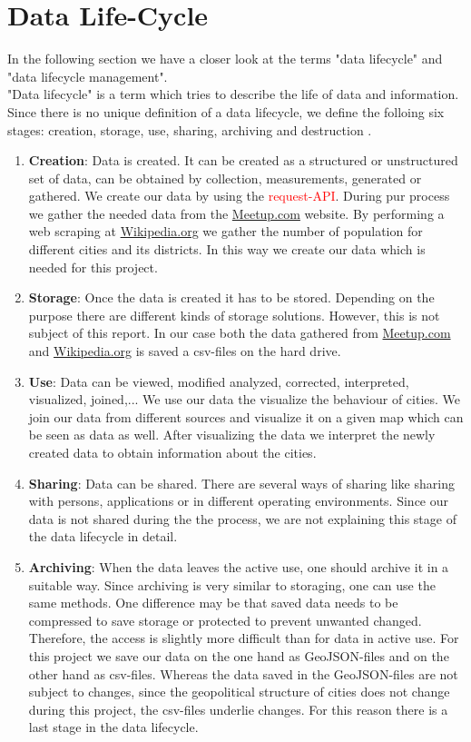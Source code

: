 \section{Data Life-Cycle}\label{sec:datalifecycle}


In the following section we have a closer look at the terms "data lifecycle" and "data lifecycle management".\\"Data lifecycle" is a term which tries to describe the life of data and information. Since there is no unique definition of a data lifecycle, we define the folloing six stages: creation, storage, use, sharing, archiving and destruction \cite{spirion}.

\begin{enumerate}
	\item \textbf{Creation}: Data is created. It can be created as a structured or unstructured set of data, can be obtained by collection, measurements, generated or gathered. We create our data by using the \textcolor{red}{request-API}. During pur process we gather the needed data from the \url{Meetup.com} website. By performing a web scraping at \url{Wikipedia.org} we gather the number of population for different cities and its districts. In this way we create our data which is needed for this project.
	\item \textbf{Storage}: Once the data is created it has to be stored. Depending on the purpose there are different kinds of storage solutions. However, this is not subject of this report. In our case both the data gathered from \url{Meetup.com} and \url{Wikipedia.org} is saved a csv-files on the hard drive.
	\item \textbf{Use}: Data can be viewed, modified analyzed, corrected, interpreted, visualized, joined,... We use our data the visualize the behaviour of cities. We join our data from different sources and visualize it on a given map which can be seen as data as well. After visualizing the data we interpret the newly created data to obtain information about the cities.
	\item \textbf{Sharing}: Data can be shared. There are several ways of sharing like sharing with persons, applications or in different operating environments. Since our data is not shared during the the process, we are not explaining this stage of the data lifecycle in detail.
	\item \textbf{Archiving}: When the data leaves the active use, one should archive it in a suitable way. Since archiving is very similar to storaging, one can use the same methods. One difference may be that saved data needs to be compressed to save storage or protected to prevent unwanted changed. Therefore, the access is slightly more difficult than for data in active use. For this project we save our data on the one hand as GeoJSON-files and on the other hand as csv-files. Whereas the data saved in the GeoJSON-files are not subject to changes, since the geopolitical structure of cities does not change during this project, the csv-files underlie changes. For this reason there is a last stage in the data lifecycle.

\end{enumerate}
